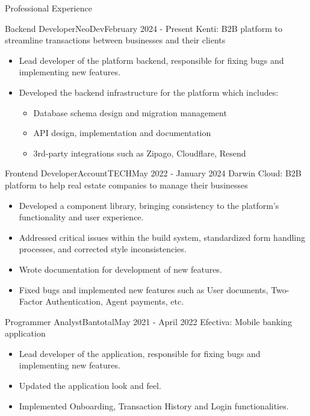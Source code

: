 \documentclass[]{mcdowell-cv/mcdowellcv}
\begin{document}
    \makeheader

    \begin{cvsection}{Professional Experience}
        \begin{cvsubsection}{Backend Developer}{NeoDev}{February 2024 - Present}
            Kenti: B2B platform to streamline transactions between businesses and their clients
            \begin{itemize}
                \item Lead developer of the platform backend, responsible for fixing bugs and implementing new features.
                \item Developed the backend infrastructure for the platform which includes:
                \begin{itemize}
                    \item Database schema design and migration management
                    \item API design, implementation and documentation
                    \item 3rd-party integrations such as Zipago, Cloudflare, Resend
                \end{itemize}
            \end{itemize}
        \end{cvsubsection}

        \begin{cvsubsection}{Frontend Developer}{AccountTECH}{May 2022 - January 2024 }
            Darwin Cloud: B2B platform to help real estate companies to manage their businesses
            \begin{itemize}
                \item Developed a component library, bringing consistency to the platform's functionality and user experience.
                \item Addressed critical issues within the build system, standardized form handling processes, and corrected style inconsistencies.
                \item Wrote documentation for development of new features.
                \item Fixed bugs and implemented new features such as User documents, Two-Factor Authentication, Agent payments, etc.
            \end{itemize}
        \end{cvsubsection}

        \begin{cvsubsection}{Programmer Analyst}{Bantotal}{May 2021 - April 2022}
            Efectiva: Mobile banking application
            \begin{itemize}
                \item Lead developer of the application, responsible for fixing bugs and implementing new features.
                \item Updated the application look and feel.
                \item Implemented Onboarding, Transaction History and Login functionalities.
            \end{itemize}


\end{cvsubsection}
\end{cvsection}
\end{document}
